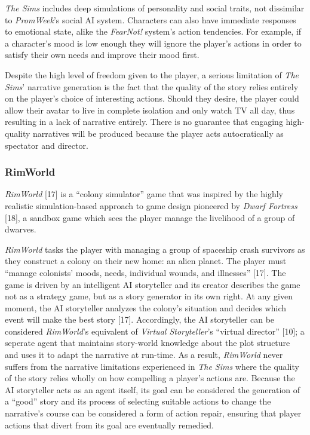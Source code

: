 \documentclass{sig-alternate-05-2015}
\begin{document}
\textit{The Sims} includes deep simulations of personality and social traits, not dissimilar to \textit{PromWeek}'s social AI system. Characters can also have immediate responses to emotional state, alike the \textit{FearNot!} system's action tendencies. For example, if a character's mood is low enough they will ignore the player's actions in order to satisfy their own needs and improve their mood first.

Despite the high level of freedom given to the player, a serious limitation of \textit{The Sims}' narrative generation is the fact that the quality of the story relies entirely on the player's choice of interesting actions. Should they desire, the player could allow their avatar to live in complete isolation and only watch TV all day, thus resulting in a lack of narrative entirely. There is no guarantee that engaging high-quality narratives will be produced because the player acts autocratically as spectator and director.

\subsubsection{RimWorld}
\textit{RimWorld} [17] is a ``colony simulator'' game that was inspired by the highly realistic simulation-based approach to game design pioneered by \textit{Dwarf Fortress} [18], a sandbox game which sees the player manage the livelihood of a group of dwarves.

\textit{RimWorld} tasks the player with managing a group of spaceship crash survivors as they construct a colony on their new home: an alien planet. The player must ``manage colonists' moods, needs, individual wounds, and illnesses'' [17]. The game is driven by an intelligent AI storyteller and its creator describes the game not as a strategy game, but as a story generator in its own right. At any given moment, the AI storyteller analyzes the colony's situation and decides which event will make the best story [17]. Accordingly, the AI storyteller can be considered \textit{RimWorld}'s equivalent of \textit{Virtual Storyteller}'s ``virtual director'' [10];  a seperate agent that maintains story-world knowledge about the plot structure and uses it to adapt the narrative at run-time. As a result, \textit{RimWorld} never suffers from the narrative limitations experienced in \textit{The Sims} where the quality of the story relies wholly on how compelling a player's actions are. Because the AI storyteller acts as an agent itself, its goal can be considered the generation of a ``good'' story and its process of selecting suitable actions to change the narrative's course can be considered a form of action repair, ensuring that player actions that divert from its goal are eventually remedied. 
\end{document}
